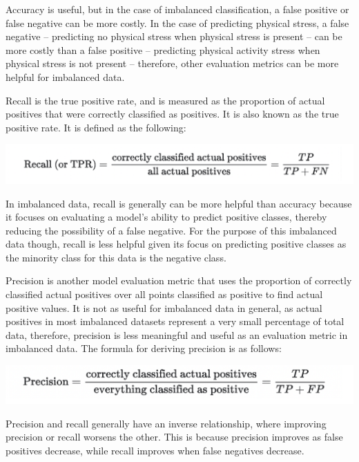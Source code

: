 \documentclass{article}
\begin{document}
Accuracy is useful, but in the case of imbalanced classification, a false positive or false negative can be more costly. In the case of predicting physical stress, a false negative – predicting no physical stress when physical stress is present – can be more costly than a false positive – predicting physical activity stress when physical stress is not present – therefore, other evaluation metrics can be more helpful for imbalanced data. 

Recall is the true positive rate, and is measured as the proportion of actual positives that were correctly classified as positives. It is also known as the true positive rate. It is defined as the following: 
\begin{center}
    \includegraphics[scale=.45]{images/RECALL.png}
\end{center}

In imbalanced data, recall is generally can be more helpful than accuracy because it focuses on evaluating a model’s ability to predict positive classes, thereby reducing the possibility of a false negative. For the purpose of this imbalanced data though, recall is less helpful given its focus on predicting positive classes as the minority class for this data is the negative class. 

Precision is another model evaluation metric that uses the proportion of correctly classified actual positives over all points classified as positive to find actual positive values. It is not as useful for imbalanced data in general, as actual positives in most imbalanced datasets represent a very small percentage of total data, therefore, precision is less meaningful and useful as an evaluation metric in imbalanced data. The formula for deriving precision is as follows:

\begin{center}
    \includegraphics[scale=.45]{images/Precision.png}
\end{center}

Precision and recall generally have an inverse relationship, where improving precision or recall worsens the other. This is because precision improves as false positives decrease, while recall improves when false negatives decrease. 
\end{document}
